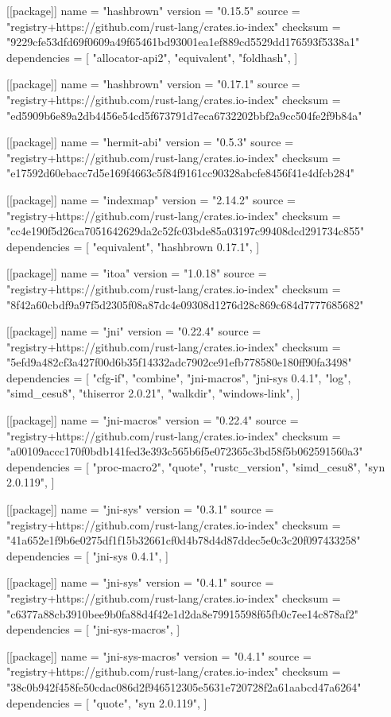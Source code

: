[[package]]
name = "hashbrown"
version = "0.15.5"
source = "registry+https://github.com/rust-lang/crates.io-index"
checksum = "9229cfe53dfd69f0609a49f65461bd93001ea1ef889cd5529dd176593f5338a1"
dependencies = [
 "allocator-api2",
 "equivalent",
 "foldhash",
]

[[package]]
name = "hashbrown"
version = "0.17.1"
source = "registry+https://github.com/rust-lang/crates.io-index"
checksum = "ed5909b6e89a2db4456e54cd5f673791d7eca6732202bbf2a9cc504fe2f9b84a"

[[package]]
name = "hermit-abi"
version = "0.5.3"
source = "registry+https://github.com/rust-lang/crates.io-index"
checksum = "e17592d60ebacc7d5e169f4663c5f84f9161cc90328abcfe8456f41e4dfcb284"

[[package]]
name = "indexmap"
version = "2.14.2"
source = "registry+https://github.com/rust-lang/crates.io-index"
checksum = "cc4e190f5d26ca7051642629da2c52fc03bde85a03197c99408dcd291734c855"
dependencies = [
 "equivalent",
 "hashbrown 0.17.1",
]

[[package]]
name = "itoa"
version = "1.0.18"
source = "registry+https://github.com/rust-lang/crates.io-index"
checksum = "8f42a60cbdf9a97f5d2305f08a87dc4e09308d1276d28c869c684d7777685682"

[[package]]
name = "jni"
version = "0.22.4"
source = "registry+https://github.com/rust-lang/crates.io-index"
checksum = "5efd9a482cf3a427f00d6b35f14332adc7902ce91efb778580e180ff90fa3498"
dependencies = [
 "cfg-if",
 "combine",
 "jni-macros",
 "jni-sys 0.4.1",
 "log",
 "simd_cesu8",
 "thiserror 2.0.21",
 "walkdir",
 "windows-link",
]

[[package]]
name = "jni-macros"
version = "0.22.4"
source = "registry+https://github.com/rust-lang/crates.io-index"
checksum = "a00109accc170f0bdb141fed3e393c565b6f5e072365c3bd58f5b062591560a3"
dependencies = [
 "proc-macro2",
 "quote",
 "rustc_version",
 "simd_cesu8",
 "syn 2.0.119",
]

[[package]]
name = "jni-sys"
version = "0.3.1"
source = "registry+https://github.com/rust-lang/crates.io-index"
checksum = "41a652e1f9b6e0275df1f15b32661cf0d4b78d4d87ddec5e0c3c20f097433258"
dependencies = [
 "jni-sys 0.4.1",
]

[[package]]
name = "jni-sys"
version = "0.4.1"
source = "registry+https://github.com/rust-lang/crates.io-index"
checksum = "c6377a88cb3910bee9b0fa88d4f42e1d2da8e79915598f65fb0c7ee14c878af2"
dependencies = [
 "jni-sys-macros",
]

[[package]]
name = "jni-sys-macros"
version = "0.4.1"
source = "registry+https://github.com/rust-lang/crates.io-index"
checksum = "38c0b942f458fe50cdac086d2f946512305e5631e720728f2a61aabcd47a6264"
dependencies = [
 "quote",
 "syn 2.0.119",
]

